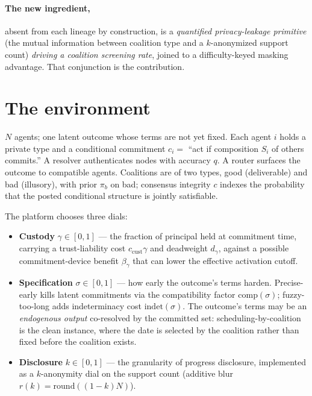 \documentclass[11pt]{article}
\theoremstyle{definition}
\theoremstyle{remark}
\begin{document}
\paragraph{The new ingredient,} absent from each lineage by construction, is a
\emph{quantified privacy-leakage primitive} (the mutual information between coalition type
and a $k$-anonymized support count) \emph{driving a coalition screening rate}, joined to a
difficulty-keyed masking advantage. That conjunction is the contribution.

\section{The environment}\label{sec:model}

$N$ agents; one latent outcome whose terms are not yet fixed. Each agent $i$ holds a
private type and a conditional commitment $c_i = $ ``act if composition $S_i$ of others
commits.'' A resolver authenticates nodes with accuracy $q$. A router surfaces the outcome
to compatible agents. Coalitions are of two types, good (deliverable) and bad (illusory),
with prior $\pi_b$ on bad; consensus integrity $c$ indexes the probability that the posted
conditional structure is jointly satisfiable.

The platform chooses three dials:
\begin{itemize}
\item \textbf{Custody} $\gamma \in [0,1]$ --- the fraction of principal held at commitment
time, carrying a trust-liability cost $c_{\mathrm{cust}}\gamma$ and deadweight $d_\gamma$,
against a possible commitment-device benefit $\beta_\gamma$ that can lower the effective
activation cutoff.
\item \textbf{Specification} $\sigma \in [0,1]$ --- how early the outcome's terms harden.
Precise-early kills latent commitments via the compatibility factor
$\mathrm{comp}(\sigma)$; fuzzy-too-long adds indeterminacy cost $\mathrm{indet}(\sigma)$.
The outcome's terms may be an \emph{endogenous output} co-resolved by the committed set:
scheduling-by-coalition is the clean instance, where the date is selected by the coalition
rather than fixed before the coalition exists.
\item \textbf{Disclosure} $k \in [0,1]$ --- the granularity of progress disclosure,
implemented as a $k$-anonymity dial on the support count (additive blur
$r(k) = \mathrm{round}((1-k)N)$).
\end{itemize}
\end{document}
